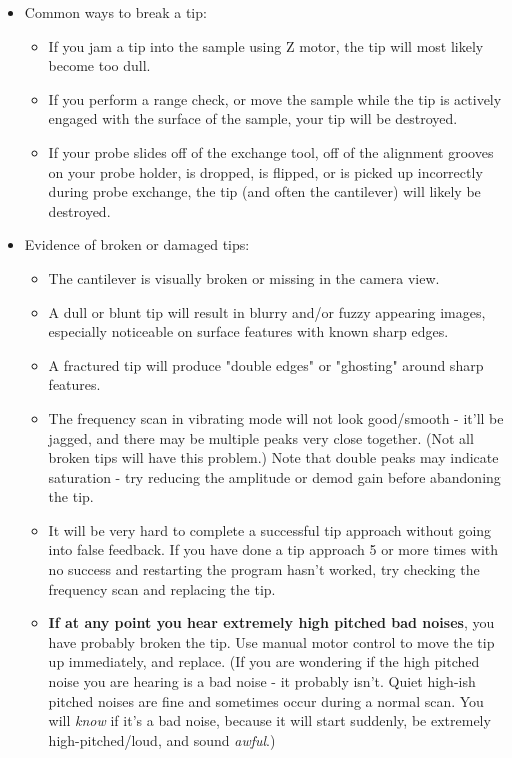 \documentclass{../lab}
\begin{document}
\begin{itemize}
    \item Common ways to break a tip:

    \begin{itemize}
        \item If you jam a tip into the sample using Z motor, the tip will most likely become too dull.

        \item If you perform a range check, or move the sample while the tip is actively engaged with the surface of the sample, your tip will be destroyed.

        \item If your probe slides off of the exchange tool, off of the alignment grooves on your probe holder, is dropped, is flipped, or is picked up incorrectly during probe exchange, the tip (and often the cantilever) will likely be destroyed.

    \end{itemize}

    \item Evidence of broken or damaged tips:

    \begin{itemize}
        \item The cantilever is visually broken or missing in the camera view.

        \item A dull or blunt tip will result in blurry and/or fuzzy appearing images, especially noticeable on surface features with known sharp edges.

        \item A fractured tip will produce "double edges" or "ghosting" around sharp features.

        \item The frequency scan in vibrating mode will not look good/smooth - it'll be jagged, and there may be multiple peaks very close together. (Not all broken tips will have this problem.) Note that double peaks may indicate saturation - try reducing the amplitude or demod gain before abandoning the tip.

        \item It will be very hard to complete a successful tip approach without going into false feedback. If you have done a tip approach 5 or more times with no success and restarting the program hasn't worked, try checking the frequency scan and replacing the tip.

        \item \textbf{If at any point you hear extremely high pitched bad noises}, you have probably broken the tip. Use manual motor control to move the tip up immediately, and replace. (If you are wondering if the high pitched noise you are hearing is a bad noise - it probably isn't. Quiet high-ish pitched noises are fine and sometimes occur during a normal scan. You will \textit{know} if it's a bad noise, because it will start suddenly, be extremely high-pitched/loud, and sound \textit{awful}.)

    \end{itemize}

\end{itemize}
\end{document}
